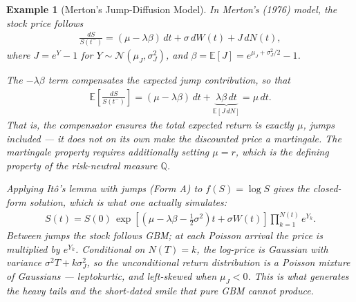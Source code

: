 \documentclass{report}
\theoremstyle{spacedplain}
\theoremstyle{spaceddefinition}
\newtheorem{example}[theorem]{Example}
\theoremstyle{spacedremark}
\begin{document}
\begin{example}[Merton's Jump-Diffusion Model]
In Merton's (1976) model, the stock price follows
\begin{align}
    \frac{dS}{S(t^-)} = (\mu - \lambda \beta)\, dt + \sigma\, dW(t) + J\, dN(t),
\end{align}
where $J = e^Y - 1$ for $Y \sim \mathcal{N}(\mu_J, \sigma_J^2)$, and $\beta = \mathbb{E}[J] = e^{\mu_J + \sigma_J^2/2} - 1$.

The $-\lambda\beta$ term compensates the expected jump contribution, so that
\begin{align}
    \mathbb{E}\!\left[\frac{dS}{S(t^-)}\right] = (\mu - \lambda\beta)\,dt + \underbrace{\lambda\beta\,dt}_{\mathbb{E}[J\,dN]} = \mu\,dt.
\end{align}
That is, the compensator ensures the \emph{total expected return is exactly} $\mu$, jumps included --- it does \emph{not} on its own make the discounted price a martingale. The martingale property requires additionally setting $\mu = r$, which is the defining property of the risk-neutral measure $\mathbb{Q}$.

Applying It\^o's lemma with jumps (Form A) to $f(S) = \log S$ gives the closed-form solution, which is what one actually simulates:
\begin{align}
    S(t) = S(0)\,\exp\left[\left(\mu - \lambda\beta - \tfrac{1}{2}\sigma^2\right)t + \sigma W(t)\right] \prod_{k=1}^{N(t)} e^{Y_k}.
\end{align}
Between jumps the stock follows GBM; at each Poisson arrival the price is multiplied by $e^{Y_k}$. Conditional on $N(T) = k$, the log-price is Gaussian with variance $\sigma^2 T + k\sigma_J^2$, so the unconditional return distribution is a Poisson mixture of Gaussians --- leptokurtic, and left-skewed when $\mu_J < 0$. This is what generates the heavy tails and the short-dated smile that pure GBM cannot produce.
\end{example}
\end{document}
